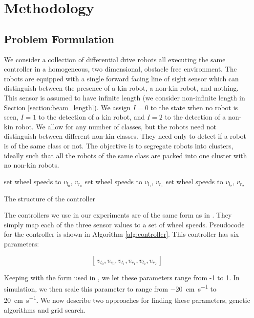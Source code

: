 \documentclass[conference]{IEEEtran}
\begin{document}
\section{Methodology}

  \subsection{Problem Formulation}

    We consider a collection of differential drive robots all executing the same controller in a homogeneous, two dimensional, obstacle free environment. The robots are equipped with a single forward facing line of sight sensor which can distinguish between the presence of a kin robot, a non-kin robot, and nothing. This sensor is assumed to have infinite length (we consider non-infinite length in Section \ref{section:beam_length}). We assign $I=0$ to the state when no robot is seen, $I=1$ to the detection of a kin robot, and $I=2$ to the detection of a non-kin robot. We allow for any number of classes, but the robots need not distinguish between different non-kin classes. They need only to detect if a robot is of the same class or not. The objective is to segregate robots into clusters, ideally such that all the robots of the same class are packed into one cluster with no non-kin robots.

    \begin{algorithm}[t!]
      \begin{algorithmic}
       \State set wheel speeds to $v_{l_0}$, $v_{r_0}$
       \State set wheel speeds to $v_{l_1}$, $v_{r_1}$
      \Else \State set wheel speeds to $v_{l_2}$, $v_{r_2}$
      \EndIf
      \end{algorithmic}
      \caption{The structure of the controller}
      \label{alg:controller}
    \end{algorithm}

    The controllers we use in our experiments are of the same form as in \cite{gauci_self-organized_2014}. They simply map each of the three sensor values to a set of wheel speeds. Pseudocode for the controller is shown in Algorithm \ref{alg:controller}. This controller has six parameters:

    $$[\,v_{l_0}, v_{r_0}, v_{l_1}, v_{r_1}, v_{l_2}, v_{r_2}\,]$$

    Keeping with the form used in \cite{gauci_self-organized_2014}, we let these parameters range from -1 to 1. In simulation, we then scale this parameter to range from \SI{-20}{\centi\meter\per\second} to \SI{20}{\centi\meter\per\second}. We now describe two approaches for finding these parameters, genetic algorithms and grid search.
\end{document}
